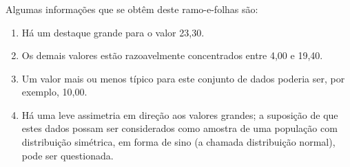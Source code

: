 \documentclass[14pt,aspectratio=1610]{beamer}
\begin{document}
\begin{frame}{}
\frametitle{}
\begin{block}{}
\justifying
\begin{table}[H]
\caption{Diagrama de Ramos e Folhas dos Salários ($\times$ sal. Min)}
\end{table}
\end{block}
\end{frame}

\begin{frame}{}
\frametitle{}
\begin{block}{}
\justifying
Algumas informações que se obtêm deste ramo-e-folhas são:
\begin{enumerate}
\item Há um destaque grande para o valor 23,30.\pause
\item Os demais valores estão razoavelmente concentrados entre 4,00 e 19,40.\pause
\item Um valor mais ou menos típico para este conjunto de dados poderia ser, por 
exemplo, 10,00.\pause
\item Há uma leve assimetria em direção aos valores grandes; a suposição de que estes dados possam ser considerados como amostra de uma população com distribuição simétrica, em forma de sino (a chamada distribuição normal), pode ser questionada.
\end{enumerate}
\end{block}
\end{frame}
\end{document}
